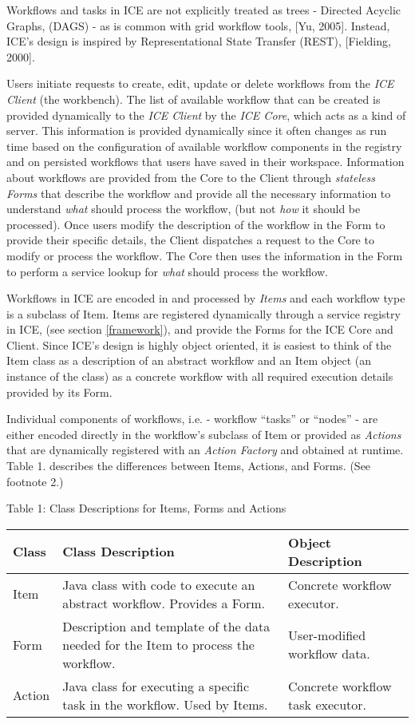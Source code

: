 Workflows and tasks in ICE are not explicitly treated as trees -
Directed Acyclic Graphs, (DAGS) - as is common with grid workflow tools,
{[}Yu, 2005{]}. Instead, ICE's design is inspired by Representational
State Transfer (REST), {[}Fielding, 2000{]}.

Users initiate requests to create, edit, update or delete workflows from
the \emph{ICE Client} (the workbench). The list of available workflow
that can be created is provided dynamically to the \emph{ICE Client} by
the \emph{ICE Core}, which acts as a kind of server. This information is
provided dynamically since it often changes as run time based on the
configuration of available workflow components in the registry and on
persisted workflows that users have saved in their workspace.
Information about workflows are provided from the Core to the Client
through \emph{stateless Forms} that describe the workflow and provide
all the necessary information to understand \emph{what} should process
the workflow, (but not \emph{how} it should be processed). Once users
modify the description of the workflow in the Form to provide their
specific details, the Client dispatches a request to the Core to modify
or process the workflow. The Core then uses the information in the Form
to perform a service lookup for \emph{what} should process the workflow.

Workflows in ICE are encoded in and processed by \emph{Items} and each
workflow type is a subclass of Item. Items are registered dynamically
through a service registry in ICE, (see section \ref{framework}), and
provide the Forms for the ICE Core and Client. Since ICE's design is
highly object oriented, it is easiest to think of the Item class as a
description of an abstract workflow and an Item object (an instance of
the class) as a concrete workflow with all required execution details
provided by its Form.

Individual components of workflows, i.e. - workflow ``tasks'' or
``nodes'' - are either encoded directly in the workflow's subclass of
Item or provided as \emph{Actions} that are dynamically registered with
an \emph{Action Factory} and obtained at runtime. Table 1. describes the
differences between Items, Actions, and Forms. (See footnote 2.)

Table 1: Class Descriptions for Items, Forms and Actions

\begin{longtable}[c]{@{}lll@{}}
\toprule
Class & Class Description & Object Description\tabularnewline
\midrule
\endhead
Item & Java class with code to execute an abstract workflow. Provides a
Form. & Concrete workflow executor.\tabularnewline
Form & Description and template of the data needed for the Item to
process the workflow. & User-modified workflow data.\tabularnewline
Action & Java class for executing a specific task in the workflow. Used
by Items. & Concrete workflow task executor.\tabularnewline
\bottomrule
\end{longtable}

